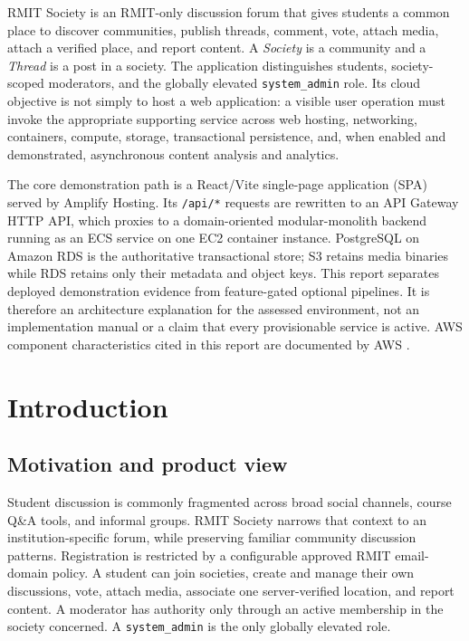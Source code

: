 \documentclass[11pt,a4paper]{article}
\begin{document}
RMIT Society is an RMIT-only discussion forum that gives students a common place to discover communities, publish threads, comment, vote, attach media, attach a verified place, and report content. A \emph{Society} is a community and a \emph{Thread} is a post in a society. The application distinguishes students, society-scoped moderators, and the globally elevated \texttt{system\_admin} role. Its cloud objective is not simply to host a web application: a visible user operation must invoke the appropriate supporting service across web hosting, networking, containers, compute, storage, transactional persistence, and, when enabled and demonstrated, asynchronous content analysis and analytics.

The core demonstration path is a React/Vite single-page application (SPA) served by Amplify Hosting. Its \texttt{/api/*} requests are rewritten to an API Gateway HTTP API, which proxies to a domain-oriented modular-monolith backend running as an ECS service on one EC2 container instance. PostgreSQL on Amazon RDS is the authoritative transactional store; S3 retains media binaries while RDS retains only their metadata and object keys. This report separates deployed demonstration evidence from feature-gated optional pipelines. It is therefore an architecture explanation for the assessed environment, not an implementation manual or a claim that every provisionable service is active. AWS component characteristics cited in this report are documented by AWS \cite{aws-amplify,aws-apigateway,aws-ecs,aws-rds,aws-s3}.

\section{Introduction}
\subsection{Motivation and product view}
Student discussion is commonly fragmented across broad social channels, course Q\&A tools, and informal groups. RMIT Society narrows that context to an institution-specific forum, while preserving familiar community discussion patterns. Registration is restricted by a configurable approved RMIT email-domain policy. A student can join societies, create and manage their own discussions, vote, attach media, associate one server-verified location, and report content. A moderator has authority only through an active membership in the society concerned. A \texttt{system\_admin} is the only globally elevated role.
\end{document}
